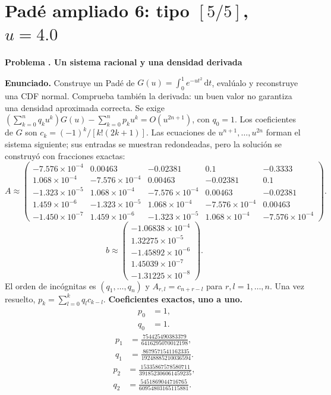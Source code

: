 \documentclass[11pt,a4paper]{article}
\newcommand{\dd}{\,\mathrm d}
\theoremstyle{definition}
\newcounter{problema}
\newenvironment{resuelto}[1]{\refstepcounter{problema}\par\medskip\Needspace{6\baselineskip}\textbf{Problema \theproblema. #1}\par}{\par\medskip}
\begin{document}
\section{\texorpdfstring{Padé ampliado 6: tipo $[5/5]$, $u=4.0$}{Padé ampliado 6: tipo [5/5], u=4.0}}
\begin{resuelto}{Un sistema racional y una densidad derivada}
\textbf{Enunciado.} Construye un Padé de $G(u)=\int_0^1e^{-ut^2}\dd t$, evalúalo y reconstruye una CDF normal. Comprueba también la derivada: un buen valor no garantiza una densidad aproximada correcta.
Se exige $(\sum_{k=0}^{n}q_ku^k)G(u)-\sum_{k=0}^{n}p_ku^k=O(u^{2n+1})$, con $q_0=1$. Los coeficientes de $G$ son $c_k=(-1)^k/[k!(2k+1)]$.
Las ecuaciones de $u^{n+1},\ldots,u^{2n}$ forman el sistema siguiente; sus entradas se muestran redondeadas, pero la solución se construyó con fracciones exactas:
{\small
\[
A\approx\begin{pmatrix}-7.576\times10^{-4}&0.00463&-0.02381&0.1&-0.3333\\1.068\times10^{-4}&-7.576\times10^{-4}&0.00463&-0.02381&0.1\\-1.323\times10^{-5}&1.068\times10^{-4}&-7.576\times10^{-4}&0.00463&-0.02381\\1.459\times10^{-6}&-1.323\times10^{-5}&1.068\times10^{-4}&-7.576\times10^{-4}&0.00463\\-1.450\times10^{-7}&1.459\times10^{-6}&-1.323\times10^{-5}&1.068\times10^{-4}&-7.576\times10^{-4}\end{pmatrix}.
\]
\[
b\approx\begin{pmatrix}-1.06838\times10^{-4}\\1.32275\times10^{-5}\\-1.45892\times10^{-6}\\1.45039\times10^{-7}\\-1.31225\times10^{-8}\end{pmatrix}.
\]
}
El orden de incógnitas es $(q_1,\ldots,q_n)$ y $A_{r,l}=c_{n+r-l}$ para $r,l=1,\ldots,n$. Una vez resuelto, $p_k=\sum_{l=0}^{k}q_lc_{k-l}$.
\textbf{Coeficientes exactos, uno a uno.}
\[
\begin{aligned}p_0&=1,\\q_0&=1.\end{aligned}
\]
\[
\begin{aligned}p_1&=\frac{754425490383379}{6416295070012198},\\q_1&=\frac{8679571541162335}{19248885210036594}.\end{aligned}
\]
\[
\begin{aligned}p_2&=\frac{15335867578580711}{391852306061459235},\\q_2&=\frac{5451869044716765}{60954803165115881}.\end{aligned}
\]
\end{resuelto}
\end{document}
